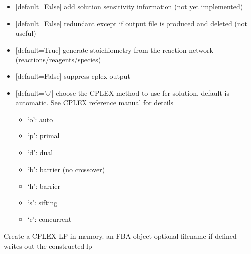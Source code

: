 \documentclass[letterpaper,10pt,english]{sphinxmanual}
\begin{document}
\begin{fulllineitems}
\begin{itemize}
\item {} 
\sphinxAtStartPar
{} {[}default=False{]} add solution sensitivity information (not yet implemented)

\item {} 
\sphinxAtStartPar
{} {[}default=False{]} redundant except if output file is produced and deleted (not useful)

\item {} 
\sphinxAtStartPar
{} {[}default=True{]} generate stoichiometry from the reaction network (reactions/reagents/species)

\item {} 
\sphinxAtStartPar
{} {[}default=False{]} suppress cplex output

\item {} 
\sphinxAtStartPar
{} {[}default=’o’{]} choose the CPLEX method to use for solution, default is automatic. See CPLEX reference manual for details
\begin{itemize}
\item {} 
\sphinxAtStartPar
‘o’: auto

\item {} 
\sphinxAtStartPar
‘p’: primal

\item {} 
\sphinxAtStartPar
‘d’: dual

\item {} 
\sphinxAtStartPar
‘b’: barrier (no crossover)

\item {} 
\sphinxAtStartPar
‘h’: barrier

\item {} 
\sphinxAtStartPar
‘s’: sifting

\item {} 
\sphinxAtStartPar
‘c’: concurrent

\end{itemize}

\end{itemize}

\end{fulllineitems}


\begin{fulllineitems}
\label{\detokenize{modules_doc:cbmpy.CBCPLEX.cplx_constructLPfromFBA}}
\pysigstartsignatures
{}
\pysigstopsignatures
\sphinxAtStartPar
Create a CPLEX LP in memory.
\sphinxhyphen{}  an FBA object
\sphinxhyphen{}  optional filename if defined writes out the constructed lp

\end{fulllineitems}
\end{document}
